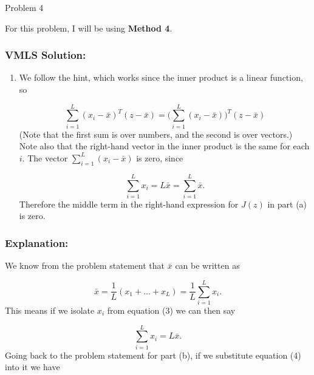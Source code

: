 \begin{problem}{Problem 4}
    \begin{Highlight}
        \noindent For this problem, I will be using \textbf{Method 4}.

        \subsubsection*{VMLS Solution:}

        \begin{enumerate}[label = (\alph*), start = 2]
            \item We follow the hint, which works since the inner product is a linear function, so
            
            \begin{equation*}
                \sum^{L}_{i = 1} (x_{i} - \bar{x})^{T}(z - \bar{x}) = \Bigg(\sum^{L}_{i = 1} (x_{i} - \bar{x})\Bigg)^{T}(z - \bar{x})
            \end{equation*}
            (Note that the first sum is over numbers, and the second is over vectors.) Note also that the right-hand vector in the inner product is the same for each $i$. The vector 
            $\sum^{L}_{i = 1}(x_{i} - \bar{x})$ is zero, since
            
            \begin{equation*}
                \sum^{L}_{i = 1} x_{i} = L \bar{x} = \sum^{L}_{i = 1} \bar{x}.
            \end{equation*}
            Therefore the middle term in the right-hand expression for $J(z)$ in part (a) is zero.
        \end{enumerate}

        \subsubsection*{Explanation:}

        We know from the problem statement that $\bar{x}$ can be written as 

        \begin{equation}
            \bar{x} = \frac{1}{L}(x_{1} + \dots + x_{L}) = \frac{1}{L} \sum^{L}_{i = 1} x_{i}.
        \end{equation}
        This means if we isolate $x_{i}$ from equation (3) we can then say 

        \begin{equation}
            \sum^{L}_{i = 1}x_{i} = L \bar{x}.
        \end{equation}
        Going back to the problem statement for part (b), if we substitute equation (4) into it we have 


\end{Highlight}
\end{problem}
